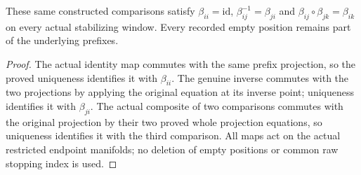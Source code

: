 \begin{lemma}
\label{hir:actual-locally-finite-history-comparison-cocycle}
\leanok
These same constructed comparisons satisfy $\beta_{ii}=\mathrm{id}$,
$\beta_{ij}^{-1}=\beta_{ji}$ and
$\beta_{ij}\circ\beta_{jk}=\beta_{ik}$ on every actual stabilizing window.
Every recorded empty position remains part of the underlying prefixes.
\end{lemma}
\begin{proof}
The actual identity map commutes with the same prefix projection, so the
proved uniqueness identifies it with $\beta_{ii}$. The genuine inverse
commutes with the two projections by applying the original equation at its
inverse point; uniqueness identifies it with $\beta_{ji}$. The actual
composite of two comparisons commutes with the original projection by their
two proved whole projection equations, so uniqueness identifies it with the
third comparison. All maps act on the actual restricted endpoint manifolds;
no deletion of empty positions or common raw stopping index is used.
\end{proof}
